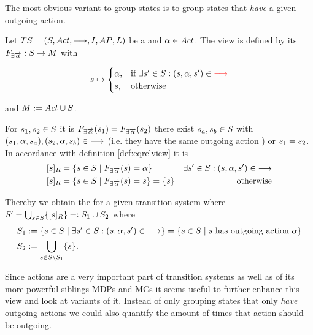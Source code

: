 \documentclass[preview]{standalone}
\begin{document}
The most obvious variant to group states is to group states that \emph{have} a given outgoing action. 

\begin{definition}
	Let ${TS} = {({S}, {Act}, {\longrightarrow}, {I}, {AP}, {L})}$ be a \chosengraphtypeN and ${\alpha} \in {Act}$. The view \viewhasoutaction is defined by its \grpfctN ${{{{F}}_{\exists{\overrightarrow{\ensuremath{{\alpha}}}}}}} : {S} \to {\ensuremath{{M}}}$ with 
	
	\[
	{s} \mapsto
	\begin{cases}
		{\alpha},				& \text{if } \exists {s}' \in {S}: ({s}, {\alpha}, {s}') \in {\color{red}\ensuremath{{\longrightarrow}}} \\
		{s},          	& \text{otherwise}
	\end{cases}
	\]
	
	and ${{M}} := {{Act} \cup {S}}$.	
\end{definition}


For ${s}_1,{s}_2 \in {S}$ it is ${{{{F}}_{\exists{\overrightarrow{\ensuremath{{\alpha}}}}}}}({s}_1) = {{{{F}}_{\exists{\overrightarrow{\ensuremath{{\alpha}}}}}}}({s}_2)$ \iffN 
there exist ${s}_{a},{s}_{b} \in {S}$ with 
$({s}_1, {\alpha}, {s}_{a}), ({s}_2, {\alpha}, {s}_{b}) \in {\longrightarrow}$ (i.e. they have the same outgoing action \action) or ${s}_1 = {s}_2$. 
In accordance with definition \ref{def:eqrelview} it is
\begin{align*}
	\eqclassv{\state} &= \{\state \in \states \mid \gfcthasoutaction(\state) = \action\} &\exists\state' \in \states : (\state, \action, \state') \in \transitionrel \\
	\eqclassv{\state} &= \{\state \in \states \mid \gfcthasoutaction(\state) = \state\} = \{s\} &\text{ otherwise}
\end{align*}

Thereby we obtain the \viewN \viewhasoutaction for a given transition system \ts where ${S}' = \bigcup_{{s} \in {S}} \{{{[{s}]_{{R}}}}\} =: {S}_1 \cup {S}_2$ where
\begin{align*}
	 {S}_1 &:= \{{s} \in {S} \mid \exists {s}' \in {S}: ({s}, {\alpha}, {s}') \in {\longrightarrow}\} = \{{s} \in {S} \mid {s} \text{ has outgoing action \ensuremath{{\alpha}}}\} \\
	{S}_2 &:= {\bigcup_{{s} \in {S} \setminus {S}_1}\{{s}\}}.
\end{align*}


Since actions are a very important part of transition systems as well as of its more powerful siblings MDPs and MCs it seems useful to further enhance this view and look at variants of it. Instead of only grouping states that only \emph{have} outgoing actions we could also quantify the amount of times that action should be outgoing.
\end{document}
